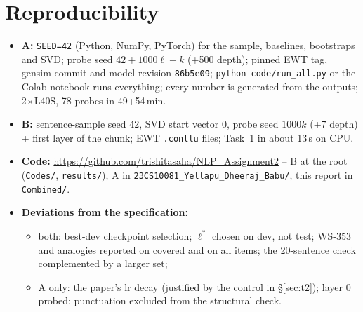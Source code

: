 \documentclass[11pt,a4paper]{article}
\newcommand{\lstar}{\ensuremath{\ell^*}}
\begin{document}
\section{Reproducibility}\label{sec:repro}
\begin{itemize}
\item \textbf{A:} \texttt{SEED=42} (Python, NumPy, PyTorch) for the sample, baselines, bootstraps and SVD; probe seed $42+1000\ell+k$ (+500 depth);
pinned EWT tag, gensim commit and model revision \texttt{86b5e09}; \texttt{python code/run\_all.py} or the Colab notebook runs everything;
every number is generated from the outputs; 2$\times$L40S, 78 probes in 49+54\,min.
\item \textbf{B:} sentence-sample seed 42, SVD start vector 0, probe seed $1000k$ (+7 depth) + first layer of the chunk; EWT \texttt{.conllu}
files; Task~1 in about 13\,s on CPU.
\item \textbf{Code:} \url{https://github.com/trishitasaha/NLP_Assignment2} -- B at the root (\texttt{Codes/}, \texttt{results/}), A in
\texttt{23CS10081\_Yellapu\_Dheeraj\_Babu/}, this report in \texttt{Combined/}.
\item \textbf{Deviations from the specification:}
\begin{itemize}
\item both: best-dev checkpoint selection; \lstar{} chosen on dev, not test; WS-353 and analogies reported on covered and on all items;
the 20-sentence check complemented by a larger set;
\item A only: the paper's lr decay (justified by the control in \S\ref{sec:t2}); layer 0 probed; punctuation excluded from the structural check.
\end{itemize}
\end{itemize}
\end{document}
